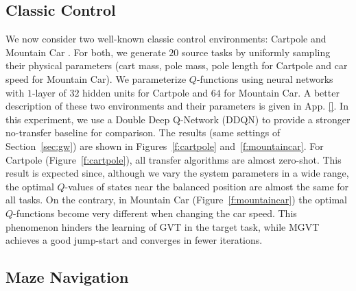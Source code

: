 \documentclass{article}
\begin{document}
\subsection{Classic Control} \label{sec:cc}

We now consider two well-known classic control environments: Cartpole and Mountain Car \citep{sutton1998reinforcement}. For both, we generate $20$ source tasks by uniformly sampling their physical parameters (cart mass, pole mass, pole length for Cartpole and car speed for Mountain Car). We parameterize $Q$-functions using neural networks with $1$-layer of $32$ hidden units for Cartpole and $64$ for Mountain Car. A better description of these two environments and their parameters is given in App. \ref{}. In this experiment, we use a Double Deep Q-Network (DDQN) \cite{van2016deep} to provide a stronger no-transfer baseline for comparison. The results (same settings of Section~\ref{sec:gw}) are shown in Figures~\ref{f:cartpole} and~\ref{f:mountaincar}. For Cartpole (Figure~\ref{f:cartpole}), all transfer algorithms are almost zero-shot. This result is expected since, although we vary the system parameters in a wide range, the optimal $Q$-values of states near the balanced position are almost the same for all tasks. On the contrary, in Mountain Car (Figure~\ref{f:mountaincar}) the optimal $Q$-functions become very different when changing the car speed. This phenomenon hinders the learning of GVT in the target task, while MGVT achieves a good jump-start and converges in fewer iterations.

\subsection{Maze Navigation} \label{sec:mn}
\end{document}
